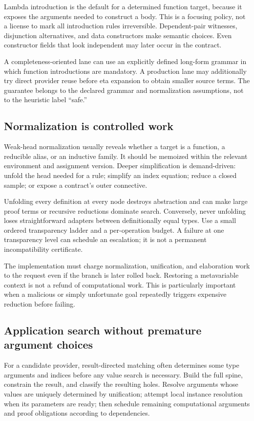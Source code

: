 Lambda introduction is the default for a determined function target, because it exposes the arguments needed to construct a body. This is a focusing policy, not a license to mark all introduction rules irreversible. Dependent-pair witnesses, disjunction alternatives, and data constructors make semantic choices. Even constructor fields that look independent may later occur in the contract.

A completeness-oriented lane can use an explicitly defined long-form grammar in which function introductions are mandatory. A production lane may additionally try direct provider reuse before eta expansion to obtain smaller source terms. The guarantee belongs to the declared grammar and normalization assumptions, not to the heuristic label ``safe.''

\subsection{Normalization is controlled work}
Weak-head normalization usually reveals whether a target is a function, a reducible alias, or an inductive family. It should be memoized within the relevant environment and assignment version. Deeper simplification is demand-driven: unfold the head needed for a rule; simplify an index equation; reduce a closed sample; or expose a contract's outer connective.

Unfolding every definition at every node destroys abstraction and can make large proof terms or recursive reductions dominate search. Conversely, never unfolding loses straightforward adapters between definitionally equal types. Use a small ordered transparency ladder and a per-operation budget. A failure at one transparency level can schedule an escalation; it is not a permanent incompatibility certificate.

The implementation must charge normalization, unification, and elaboration work to the request even if the branch is later rolled back. Restoring a metavariable context is not a refund of computational work. This is particularly important when a malicious or simply unfortunate goal repeatedly triggers expensive reduction before failing.

\subsection{Application search without premature argument choices}
For a candidate provider, result-directed matching often determines some type arguments and indices before any value search is necessary. Build the full spine, constrain the result, and classify the resulting holes. Resolve arguments whose values are uniquely determined by unification; attempt local instance resolution when its parameters are ready; then schedule remaining computational arguments and proof obligations according to dependencies.

